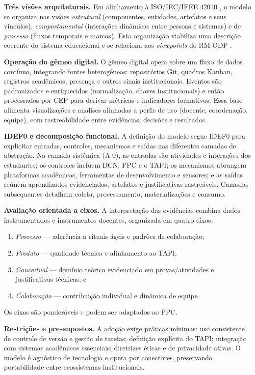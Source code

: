 \documentclass[12pt,a4paper]{article}
\begin{document}
\textbf{Três visões arquiteturais.} Em alinhamento à ISO/IEC/IEEE 42010 \cite{iso42010}, o modelo se organiza nas visões \emph{estrutural} (componentes, entidades, artefatos e seus vínculos), \emph{comportamental} (interações dinâmicas entre pessoas e sistemas) e de \emph{processo} (fluxos temporais e marcos). Esta organização viabiliza uma descrição coerente do sistema educacional e se relaciona aos \emph{viewpoints} do RM-ODP \cite{iso10746}.

\textbf{Operação do gêmeo digital.} O gêmeo digital opera sobre um fluxo de dados contínuo, integrando fontes heterogêneas: repositórios Git, quadros Kanban, registros acadêmicos, presença e outros sinais institucionais. Eventos são padronizados e enriquecidos (normalização, chaves institucionais) e então processados por CEP para derivar métricas e indicadores formativos. Essa base alimenta visualizações e análises alinhadas a perfis de uso (docente, coordenação, equipe), com rastreabilidade entre evidências, decisões e resultados.

\textbf{IDEF0 e decomposição funcional.} A definição do modelo segue IDEF0 para explicitar entradas, controles, mecanismos e saídas nas diferentes camadas de abstração. Na camada sistêmica (A-0), as entradas são atividades e interações dos estudantes; os controles incluem DCN, PPC e o TAPI; os mecanismos abrangem plataformas acadêmicas, ferramentas de desenvolvimento e sensores; e as saídas reúnem aprendizados evidenciados, artefatos e justificativas rastreáveis. Camadas subsequentes detalham coleta, processamento, materializações e consumo.

\textbf{Avaliação orientada a eixos.} A interpretação das evidências combina dados instrumentados e instrumentos docentes, organizada em quatro eixos:
\begin{enumerate}
  \item \emph{Processo} — aderência a rituais ágeis e padrões de colaboração;
  \item \emph{Produto} — qualidade técnica e alinhamento ao TAPI;
  \item \emph{Conceitual} — domínio teórico evidenciado em provas/atividades e justificativas técnicas; e
  \item \emph{Colaboração} — contribuição individual e dinâmica de equipe.
\end{enumerate}
Os eixos são ponderáveis e podem ser adaptados ao PPC.

\textbf{Restrições e pressupostos.} A adoção exige práticas mínimas: uso consistente de controle de versão e gestão de tarefas; definição explícita do TAPI; integração com sistemas acadêmicos essenciais; diretrizes éticas e de privacidade ativas. O modelo é agnóstico de tecnologia e opera por conectores, preservando portabilidade entre ecossistemas institucionais.
\end{document}
